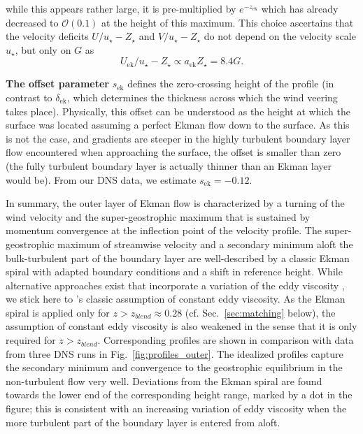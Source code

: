 \documentclass[smallcondensed,final]{svjour3}
\begin{document}
while this appears rather large, it is pre-multiplied by $e^{-z_\mathrm{ek}}$ which has already decreased
to $\mathcal{O}(0.1)$ at the height of this maximum.
%
This choice ascertains that the velocity deficits $U/u_\star-Z_\star$ and $V/u_\star-Z_\star$ do not
depend on the velocity scale $u_\star$, but only on $G$ as
\begin{equation}
  U_\mathrm{ek}/u_\star-Z_\star \propto a_\mathrm{ek} Z_\star = 8.4G.
  \label{eqn:hodograph_scaling}
\end{equation}
%
\par
%
\textbf{The offset parameter} $s_\mathrm{ek}$ defines the zero-crossing height of the profile
(in contrast to $\delta_\mathrm{ek}$, which determines the thickness across which the wind veering takes place). 
%
Physically, this offset can be understood as the height at which the surface was located assuming
a perfect Ekman flow down to the surface.
%
As this is not the case, and gradients are steeper in the highly turbulent boundary layer flow encountered
when approaching the surface, the offset is smaller than zero (the fully turbulent boundary layer is
actually thinner than an Ekman layer would be).
%
From our DNS data, we estimate $s_\mathrm{ek}=-0.12$. 
%
\par 
% 
In summary, the outer layer of Ekman flow is characterized by a turning of the wind
velocity and the super-geostrophic maximum that is sustained by momentum convergence
at the inflection point of the velocity profile.
%
The super-geostrophic maximum of streamwise velocity and a secondary minimum aloft the bulk-turbulent part of
the boundary layer are well-described by a classic Ekman spiral with adapted boundary conditions and a shift
in reference height.
%
While alternative approaches exist that incorporate a variation of the eddy viscosity \citep{basu:BM2023}, 
we stick here to \citeauthor{ekman:AMA1905}'s classic assumption of constant eddy viscosity. 
As the Ekman spiral is applied only for $z>z_{blend}\approx 0.28$ (cf. Sec.~\ref{sec:matching}
below), the assumption of constant eddy viscosity is also weakened in the sense that it is only required for 
$z>z_{blend}$. 
% 
Corresponding profiles are shown in comparison with data from three DNS runs in Fig.~\ref{fig:profiles_outer}.
The idealized profiles capture the secondary minimum and convergence to the geostrophic equilibrium in the
non-turbulent flow very well.
%
Deviations from the Ekman spiral are found towards the lower end of the corresponding height range, 
marked by a dot in the figure; this is consistent with an increasing variation of eddy viscosity when 
the more turbulent part of the boundary layer is entered from aloft. 
\end{document}
